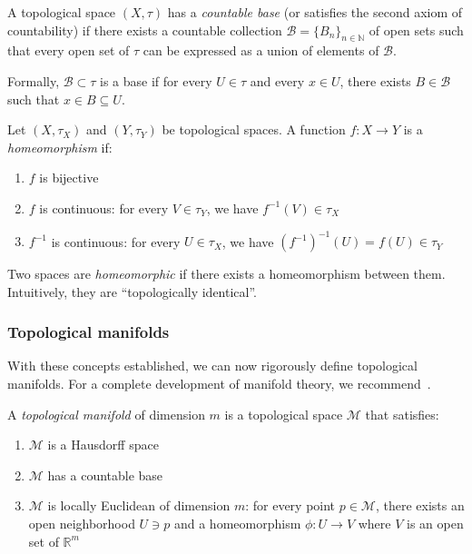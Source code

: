 \begin{definition}\label{def:base_numerable}
A topological space $(X, \tau)$ has a \textit{countable base} (or satisfies the second axiom of countability) if there exists a countable collection $\mathcal{B} = \{B_n\}_{n \in \mathbb{N}}$ of open sets such that every open set of $\tau$ can be expressed as a union of elements of $\mathcal{B}$.

Formally, $\mathcal{B} \subset \tau$ is a base if for every $U \in \tau$ and every $x \in U$, there exists $B \in \mathcal{B}$ such that $x \in B \subseteq U$.
\end{definition}

\begin{definition}[Homeomorphism]\label{def:homeomorfismo}
Let $(X, \tau_X)$ and $(Y, \tau_Y)$ be topological spaces. A function $f: X \to Y$ is a \textit{homeomorphism} if:
\begin{enumerate}
	\item $f$ is bijective
	\item $f$ is continuous: for every $V \in \tau_Y$, we have $f^{-1}(V) \in \tau_X$
	\item $f^{-1}$ is continuous: for every $U \in \tau_X$, we have $(f^{-1})^{-1}(U) = f(U) \in \tau_Y$
\end{enumerate}
Two spaces are \textit{homeomorphic} if there exists a homeomorphism between them. Intuitively, they are ``topologically identical''.
\end{definition}

\subsubsection{Topological manifolds}\label{subsubsec:variedades_topologicas}

With these concepts established, we can now rigorously define topological manifolds. For a complete development of manifold theory, we recommend~\citet{lee2012introduction}.

\begin{definition}\label{def:variedad_topologica}
A \textit{topological manifold} of dimension $m$ is a topological space $\mathcal{M}$ that satisfies:
\begin{enumerate}
	\item $\mathcal{M}$ is a Hausdorff space
	\item $\mathcal{M}$ has a countable base
	\item $\mathcal{M}$ is locally Euclidean of dimension $m$: for every point $p \in \mathcal{M}$, there exists an open neighborhood $U \ni p$ and a homeomorphism $\phi: U \to V$ where $V$ is an open set of $\mathbb{R}^m$
\end{enumerate}
\end{definition}


